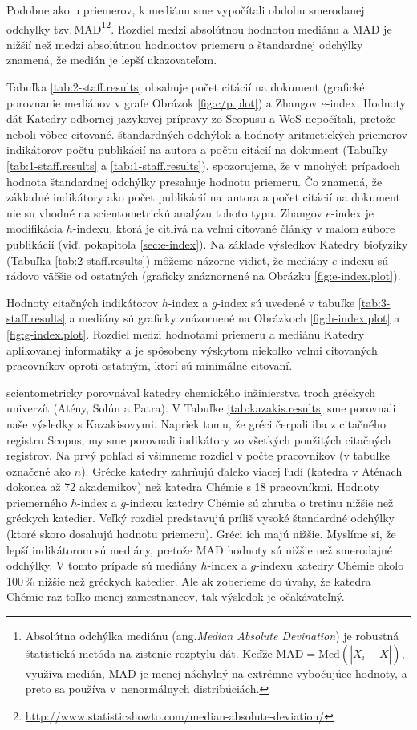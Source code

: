 Podobne ako u priemerov, k mediánu sme vypočítali obdobu smerodanej odchylky
tzv.\,MAD\footnote{Absolútna odchýlka mediánu
(ang.\emph{Median Absolute Devination}) je robustná štatistická metóda na
zistenie rozptylu dát. Keďže $\mathrm{MAD} = \mathrm{Med}(|X_i - \tilde{X}|)$,
využíva medián, MAD je menej náchylný na extrémne vybočujúce hodnoty, a preto
sa používa v~nenormálnych
distribúciách.}\footnote{\url{http://www.statisticshowto.com/median-absolute-deviation/}}.
Rozdiel medzi absolútnou hodnotou mediánu a MAD je nižšií 
než medzi absolútnou hodnoutov priemeru a štandardnej odchýlky znamená, že
medián je lepší ukazovateľom.

Tabuľka \ref{tab:2-staff.results} obsahuje počet citácií na dokument (grafické
porovnanie mediánov v grafe Obrázok \ref{fig:c/p.plot}) a Zhangov $e$-index.
Hodnoty dát Katedry odbornej jazykovej prípravy zo Scopusu a WoS nepočítali,
pretože neboli vôbec citované.  štandardných odchýlok a hodnoty aritmetických
priemerov indikátorov počtu publikácií na autora a počtu citácií na dokument
(Tabuľky \ref{tab:1-staff.results} a \ref{tab:1-staff.results}), spozorujeme, že v
mnohých prípadoch hodnota štandardnej odchýlky presahuje hodnotu priemeru.  Čo
znamená, že základné indikátory ako počet publikácií na~autora a počet citácií
na dokument nie su vhodné na scientometrickú analýzu tohoto typu.  Zhangov
$e$-index  je modifikácia $h$-indexu, ktorá je citlivá na veľmi citované články
v malom súbore publikácií (viď. pokapitola \ref{sec:e-index}).  Na základe
výsledkov Katedry biofyziky (Tabuľka \ref{tab:2-staff.results}) môžeme názorne
vidieť, že mediány $e$-indexu sú rádovo väčšie od ostatných (graficky
znáznornené na Obrázku \ref{fig:e-index.plot}).

Hodnoty citačných indikátorov $h$-index a $g$-index sú uvedené v tabuľke
\ref{tab:3-staff.results} a mediány sú graficky znázornené na Obrázkoch
\ref{fig:h-index.plot} a \ref{fig:g-index.plot}.  Rozdiel medzi hodnotami
priemeru a mediánu Katedry aplikovanej informatiky a je spôsobeny výskytom
niekoľko veľmi citovaných pracovníkov oproti ostatným, ktorí sú minimálne
citovaní.

\citet{Kazakis2015} scientometricky porovnával katedry chemického inžinierstva
troch gréckych univerzít (Atény, Solún a Patra).  V Tabuľke
\ref{tab:kazakis.results} sme porovnali naše výsledky s Kazakisovymi. Napriek
tomu, že gréci čerpali iba z citačného registru Scopus, my sme porovnali
indikátory zo všetkých použitých citačných registrov. Na prvý pohľad si
všimneme rozdiel v počte pracovníkov (v tabuľke označené ako $n$).  Grécke
katedry zahrňujú ďaleko viacej ľudí (katedra v Aténach dokonca až 72
akademikov) než katedra Chémie s 18 pracovníkmi.  Hodnoty priemerného $h$-index
a $g$-indexu katedry Chémie sú  zhruba o tretinu nižšie než gréckych katedier.
Veľký rozdiel predstavujú príliš vysoké štandardné odchýlky (ktoré skoro
dosahujú hodnotu priemeru). Gréci ich majú nižšie.  Myslíme si, že lepší
indikátorom sú mediány, pretože MAD hodnoty sú nižšie než smerodajné odchýlky.
V tomto prípade sú mediány $h$-index a $g$-indexu katedry Chémie okolo 100\,\%
nižšie než gréckych katedier. Ale ak zoberieme do úvahy, že katedra Chémie raz
toľko menej zamestnancov, tak výsledok je očakávateľný.

